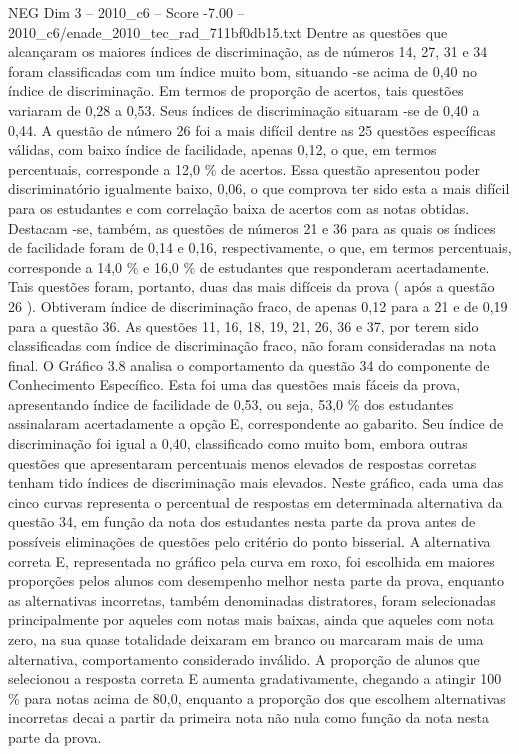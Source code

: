 \begin{textsample}{NEG Dim 3 – 2010\_c6 – Score -7.00 – 2010\_c6/enade\_2010\_tec\_rad\_711bf0db15.txt}
Dentre as questões que alcançaram os maiores índices de discriminação, as de números 14, 27, 31 e 34 foram classificadas com um índice muito bom, situando -se acima de 0,40 no índice de discriminação.
Em termos de proporção de acertos, tais questões variaram de 0,28 a 0,53.
Seus índices de discriminação situaram -se de 0,40 a 0,44.
A questão de número 26 foi a mais difícil dentre as 25 questões específicas válidas, com baixo índice de facilidade, apenas 0,12, o que, em termos percentuais, corresponde a 12,0 \% de acertos.
Essa questão apresentou poder discriminatório igualmente baixo, 0,06, o que comprova ter sido esta a mais difícil para os estudantes e com correlação baixa de acertos com as notas obtidas.
Destacam -se, também, as questões de números 21 e 36 para as quais os índices de facilidade foram de 0,14 e 0,16, respectivamente, o que, em termos percentuais, corresponde a 14,0 \% e 16,0 \% de estudantes que responderam acertadamente.
Tais questões foram, portanto, duas das mais difíceis da prova ( após a questão 26 ).
Obtiveram índice de discriminação fraco, de apenas 0,12 para a 21 e de 0,19 para a questão 36.
As questões 11, 16, 18, 19, 21, 26, 36 e 37, por terem sido classificadas com índice de discriminação fraco, não foram consideradas na nota final.
O Gráfico 3.8 analisa o comportamento da questão 34 do componente de Conhecimento Específico.
Esta foi uma das questões mais fáceis da prova, apresentando índice de facilidade de 0,53, ou seja, 53,0 \% dos estudantes assinalaram acertadamente a opção E, correspondente ao gabarito.
Seu índice de discriminação foi igual a 0,40, classificado como muito bom, embora outras questões que apresentaram percentuais menos elevados de respostas corretas tenham tido índices de discriminação mais elevados.
Neste gráfico, cada uma das cinco curvas representa o percentual de respostas em determinada alternativa da questão 34, em função da nota dos estudantes nesta parte da prova antes de possíveis eliminações de questões pelo critério do ponto bisserial.
A alternativa correta E, representada no gráfico pela curva em roxo, foi escolhida em maiores proporções pelos alunos com desempenho melhor nesta parte da prova, enquanto as alternativas incorretas, também denominadas distratores, foram selecionadas principalmente por aqueles com notas mais baixas, ainda que aqueles com nota zero, na sua quase totalidade deixaram em branco ou marcaram mais de uma alternativa, comportamento considerado inválido.
A proporção de alunos que selecionou a resposta correta E aumenta gradativamente, chegando a atingir 100 \% para notas acima de 80,0, enquanto a proporção dos que escolhem alternativas incorretas decai a partir da primeira nota não nula como função da nota nesta parte da prova.

\end{textsample}
